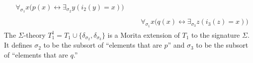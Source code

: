 \begin{example}
\begin{align*}
\begin{aligned}
&\forall_{\sigma_1} x\big(p(x)\leftrightarrow\exists_{\sigma_2} y(i_2(y)=x)\big)
\end{aligned} 
\tag{$\delta_p$}\\
%
&\begin{aligned}
&\forall_{\sigma_1} x\big(q(x)\leftrightarrow\exists_{\sigma_3} z(i_3(z)=x)\big)
\end{aligned}
\tag{$\delta_q$}
\end{align*}
The $\Sigma$-theory $T_1^1=T_1\cup\{\delta_{\sigma_2},
\delta_{\sigma_3}\}$ is a Morita extension of $T_1$ to the signature
$\Sigma$.  It defines $\sigma_2$ to be the subsort of ``elements that
are $p$'' and $\sigma_3$ to be the subsort of ``elements that are
$q$.''

\end{example}
